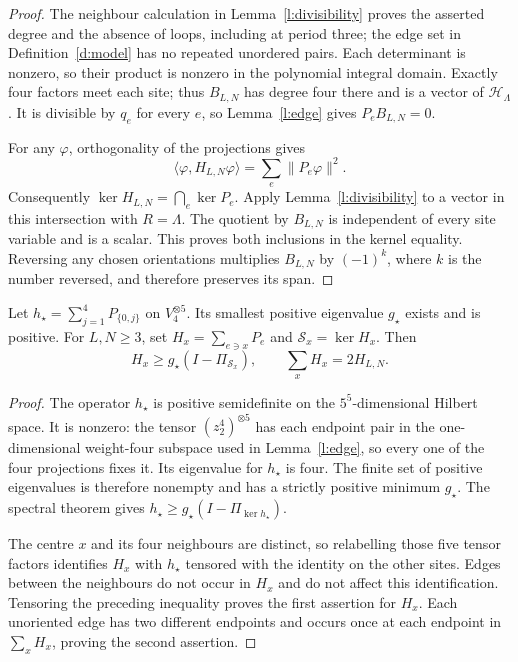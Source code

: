 \begin{proof}
The neighbour calculation in Lemma~\ref{l:divisibility} proves
the asserted degree and the absence of loops, including at period
three; the edge set in Definition~\ref{d:model} has no repeated
unordered pairs. Each determinant is nonzero, so their product is
nonzero in the polynomial integral domain. Exactly four factors
meet each site; thus \(B_{L,N}\) has degree four there and is a
vector of \(\mathcal H_\Lambda\).
It is divisible by \(q_e\) for every \(e\), so
Lemma~\ref{l:edge} gives \(P_eB_{L,N}=0\).

For any \(\varphi\), orthogonality of the projections gives
\[
 \langle\varphi,H_{L,N}\varphi\rangle
       =\sum_e\|P_e\varphi\|^2.
\]
Consequently \(\ker H_{L,N}=\bigcap_e\ker P_e\).
Apply Lemma~\ref{l:divisibility} to a vector in this intersection
with \(R=\Lambda\). The quotient by \(B_{L,N}\) is independent
of every site variable and is a scalar. This proves both inclusions
in the kernel equality. Reversing any chosen orientations multiplies
\(B_{L,N}\) by \((-1)^k\), where \(k\) is the number reversed,
and therefore preserves its span.
\end{proof}

\begin{lemma}\label{l:star}
Let \(h_\star=\sum_{j=1}^4P_{\{0,j\}}\) on \(V_4^{\otimes5}\).
Its smallest positive eigenvalue \(g_\star\) exists and is positive.
For \(L,N\ge3\), set \(H_x=\sum_{e\ni x}P_e\) and
\(\mathcal S_x=\ker H_x\). Then
\[
 H_x\ge g_\star(I-\Pi_{\mathcal S_x}),\qquad
 \sum_xH_x=2H_{L,N}.
\]
\end{lemma}

\begin{proof}
The operator \(h_\star\) is positive semidefinite on the
\(5^5\)-dimensional Hilbert space. It is nonzero: the tensor
\((z_2^4)^{\otimes5}\) has each endpoint pair in the
one-dimensional weight-four subspace used in Lemma~\ref{l:edge},
so every one of the four projections fixes it. Its eigenvalue for
\(h_\star\) is four. The finite set of positive eigenvalues is
therefore nonempty and has a strictly positive minimum \(g_\star\).
The spectral theorem gives
\(h_\star\ge g_\star(I-\Pi_{\ker h_\star})\).

The centre \(x\) and its four neighbours are distinct, so relabelling
those five tensor factors identifies \(H_x\) with
\(h_\star\) tensored with the identity on the other sites.
Edges between the neighbours do not occur in \(H_x\) and do not
affect this identification. Tensoring the preceding inequality
proves the first assertion for \(H_x\). Each unoriented edge has
two different endpoints and occurs once at each endpoint in
\(\sum_xH_x\), proving the second assertion.
\end{proof}

